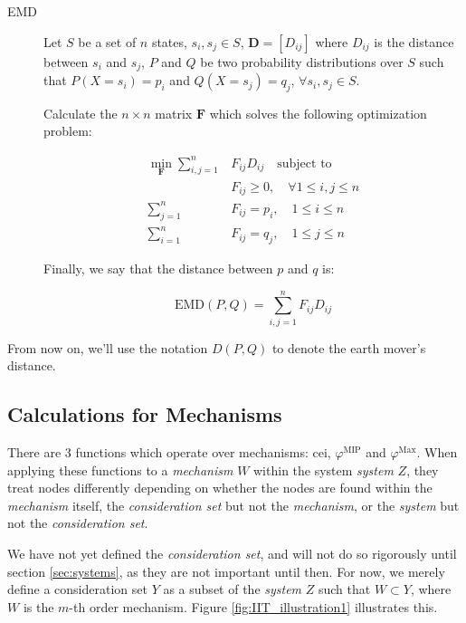 \begin{description}
	\item[EMD] Let $S$ be a set of $n$ states, $s_i, s_j \in S$, $\mathbf{D} = \left[ D_{ij}\right]$ where $D_{ij}$ is the distance between $s_i$ and $s_j$, $P$ and $Q$ be two probability distributions over $S$ such that $P(X = s_i) = p_i$ and $Q(X=s_j) = q_j$, $\forall s_i, s_j \in S$. 
	
	Calculate the $n\times n$ matrix $\mathbf{F}$ which solves the following optimization problem:
	
	\begin{align}
	\label{eq:EMD1}
	\min \limits_{\mathbf{F}}\sum \limits_{i,j=1}^n &F_{ij} D_{ij}\quad \text{subject to}\\
	&F_{ij}\geq 0,\quad \forall 1 \leq i,j \leq n\\
	\sum \limits_{j=1}^n &F_{ij} = p_i,\quad 1 \leq i \leq n\\
	\sum \limits_{i=1}^n &F_{ij} = q_j,\quad 1 \leq j \leq n
	\end{align}
	
	Finally, we say that the distance between $p$ and $q$ is: 
	
	\begin{equation}
	\label{def:EMD}
	\text{EMD}(P, Q) = \sum \limits_{i,j=1}^{n} F_{ij} D_{ij}
	\end{equation}
\end{description}

From now on, we'll use the notation $D(P,Q)$ to denote the earth mover's distance.

\subsection{Calculations for Mechanisms}\label{sec:little_phi}
There are 3 functions which operate over mechanisms: cei, $\varphi^{\text{MIP}}$ and $\varphi^{\text{Max}}$. When applying these functions to a \textit{mechanism} $W$ within the system \textit{system} $Z$, they treat nodes differently depending on whether the nodes are found within the \textit{mechanism} itself, the \textit{consideration set} but not the \textit{mechanism}, or the \textit{system} but not the \textit{consideration set}.

We have not yet defined the \textit{consideration set}, and will not do so rigorously until section \ref{sec:systems}, as they are not important until then. For now, we merely define a consideration set $Y$ as a subset of the \textit{system} $Z$ such that $W \subset Y$, where $W$ is the $m$-th order mechanism. Figure \ref{fig:IIT_illustration1} illustrates this.


